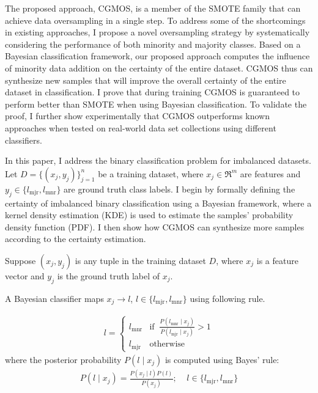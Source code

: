 \documentclass{iitthesis}
\begin{document}
The proposed approach, CGMOS, is a member of the SMOTE family that can achieve data oversampling in a single step. To address some of the shortcomings in existing approaches, I propose a novel oversampling strategy by systematically considering the performance of both minority and majority classes. Based on a Bayesian classification framework, our proposed approach computes the influence of minority data addition on the certainty of the entire dataset. CGMOS thus can synthesize new samples that will improve the overall certainty of the entire dataset in classification. I prove that during training CGMOS is guaranteed to perform better than SMOTE when using Bayesian classification. To validate the proof, I further show experimentally that CGMOS outperforms known approaches when tested on real-world data set collections using different classifiers.


In this paper, I address the binary classification problem for imbalanced datasets. Let $D=\{(x_j, y_j)\}_{j=1}^n$ be a training dataset, where $x_j \in \mathfrak{R}^m$ are features and $y_j \in \{l_{\mbox{mjr}}, l_{\mbox{mnr}}\}$ are ground truth class labels. I begin by formally defining the certainty of imbalanced binary classification using a Bayesian framework, where a kernel density estimation (KDE) is used to estimate the samples' probability density function (PDF). I then show how CGMOS can synthesize more samples according to the certainty estimation.

 Suppose $(x_j, y_j)$ is any tuple in the training dataset $D$, where $x_j$ is a feature vector and $y_j$ is the ground truth label of $x_j$.

A Bayesian classifier maps $x_j \rightarrow l$, $l\in\{l_{\mbox{mjr}}, l_{\mbox{mnr}}\}$ using following rule. 

\begin{align*}
l = \left\{
\begin{array}{cl}
  l_{\mbox{mnr}} & \text{if} \;\; \frac{P(l_{\mbox{mnr}} \mid x_j)}{P(l_{\mbox{mjr}} \mid x_j)} > 1\\
  l_{\mbox{mjr}} & \text{otherwise}
\end{array}\right.
\end{align*}
where the posterior probability $P(l\mid x_j)$ is computed using Bayes' rule:
\begin{align*}
P(l \mid x_j) = \frac{P(x_j \mid l)P(l)}{P(x_j)}; \;\;\;\; l\in\{l_{\mbox{mjr}}, l_{\mbox{mnr}}\}
\end{align*}
\end{document}
